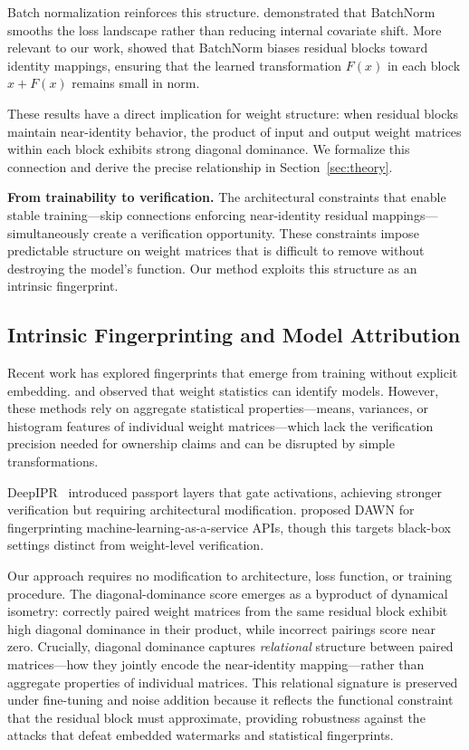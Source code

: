 \documentclass[wcp]{jmlr}
\begin{document}
Batch normalization reinforces this structure. \citet{santurkar2018does} demonstrated that BatchNorm smooths the loss landscape rather than reducing internal covariate shift. More relevant to our work, \citet{de2020batch} showed that BatchNorm biases residual blocks toward identity mappings, ensuring that the learned transformation $F(x)$ in each block $x + F(x)$ remains small in norm.

These results have a direct implication for weight structure: when residual blocks maintain near-identity behavior, the product of input and output weight matrices within each block exhibits strong diagonal dominance. We formalize this connection and derive the precise relationship in Section~\ref{sec:theory}.

\textbf{From trainability to verification.} The architectural constraints that enable stable training---skip connections enforcing near-identity residual mappings---simultaneously create a verification opportunity. These constraints impose predictable structure on weight matrices that is difficult to remove without destroying the model's function. Our method exploits this structure as an intrinsic fingerprint.

\subsection{Intrinsic Fingerprinting and Model Attribution}

Recent work has explored fingerprints that emerge from training without explicit embedding. \citet{zheng2022fingerprinting} and \citet{zhao2020shaping} observed that weight statistics can identify models. However, these methods rely on aggregate statistical properties---means, variances, or histogram features of individual weight matrices---which lack the verification precision needed for ownership claims and can be disrupted by simple transformations.

DeepIPR~\citep{fan2019rethinking} introduced passport layers that gate activations, achieving stronger verification but requiring architectural modification. \citet{szyller2021dawn} proposed DAWN for fingerprinting machine-learning-as-a-service APIs, though this targets black-box settings distinct from weight-level verification.

Our approach requires no modification to architecture, loss function, or training procedure. The diagonal-dominance score emerges as a byproduct of dynamical isometry: correctly paired weight matrices from the same residual block exhibit high diagonal dominance in their product, while incorrect pairings score near zero. Crucially, diagonal dominance captures \emph{relational} structure between paired matrices---how they jointly encode the near-identity mapping---rather than aggregate properties of individual matrices. This relational signature is preserved under fine-tuning and noise addition because it reflects the functional constraint that the residual block must approximate, providing robustness against the attacks that defeat embedded watermarks and statistical fingerprints.
\end{document}
